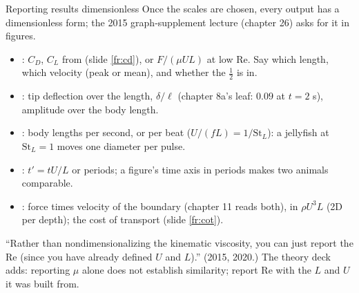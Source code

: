 \documentclass[aspectratio=169,11pt]{beamer}
\begin{document}
\begin{frame}{Reporting results dimensionless}
\label{fr:report}
\small Once the scales are chosen, every output has a dimensionless form; the 2015 graph-supplement lecture (chapter 26) asks for it in figures.
\begin{itemize}
  \item {}: $C_D$, $C_L$ from  (slide \ref{fr:cd}), or $F/(\mu U L)$ at low $\mathrm{Re}$. Say which length, which velocity (peak or mean), and whether the $\frac12$ is in.
  \item {}: tip deflection over the length, $\delta/\ell$ (chapter 8a's leaf: $0.09$ at $t = 2$ s), amplitude over the body length.
  \item {}: body lengths per second, or per beat ($U/(fL) = 1/\mathrm{St}_L$): a jellyfish at $\mathrm{St}_L = 1$ moves one diameter per pulse.
  \item {}: $t' = tU/L$ or periods; a figure's time axis in periods makes two animals comparable.
  \item {}: force times velocity of the boundary (chapter 11 reads both), in $\rho U^3 L$ (2D per depth); the cost of transport (slide \ref{fr:cot}).
\end{itemize}
\vspace{1mm}
\begin{punchbox}
\small ``Rather than nondimensionalizing the kinematic viscosity, you can just report the Re (since you have already defined $U$ and $L$).'' (2015, 2020.) The theory deck adds: reporting $\mu$ alone does not establish similarity; report $\mathrm{Re}$ with the $L$ and $U$ it was built from.
\end{punchbox}
\end{frame}
\end{document}
